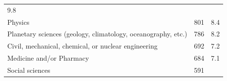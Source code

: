 \documentclass[]{article}
\begin{document}
\begin{longtable}[]{@{}lrr@{}}
\begin{minipage}[t]{0.05\columnwidth}
9.8\strut
\end{minipage}\tabularnewline
\begin{minipage}[t]{0.81\columnwidth}\raggedright\strut
Physics\strut
\end{minipage} & \begin{minipage}[t]{0.05\columnwidth}\raggedleft\strut
801\strut
\end{minipage} & \begin{minipage}[t]{0.05\columnwidth}\raggedleft\strut
8.4\strut
\end{minipage}\tabularnewline
\begin{minipage}[t]{0.81\columnwidth}\raggedright\strut
Planetary sciences (geology, climatology, oceanography, etc.)\strut
\end{minipage} & \begin{minipage}[t]{0.05\columnwidth}\raggedleft\strut
786\strut
\end{minipage} & \begin{minipage}[t]{0.05\columnwidth}\raggedleft\strut
8.2\strut
\end{minipage}\tabularnewline
\begin{minipage}[t]{0.81\columnwidth}\raggedright\strut
Civil, mechanical, chemical, or nuclear engineering\strut
\end{minipage} & \begin{minipage}[t]{0.05\columnwidth}\raggedleft\strut
692\strut
\end{minipage} & \begin{minipage}[t]{0.05\columnwidth}\raggedleft\strut
7.2\strut
\end{minipage}\tabularnewline
\begin{minipage}[t]{0.81\columnwidth}\raggedright\strut
Medicine and/or Pharmacy\strut
\end{minipage} & \begin{minipage}[t]{0.05\columnwidth}\raggedleft\strut
684\strut
\end{minipage} & \begin{minipage}[t]{0.05\columnwidth}\raggedleft\strut
7.1\strut
\end{minipage}\tabularnewline
\begin{minipage}[t]{0.81\columnwidth}\raggedright\strut
Social sciences\strut
\end{minipage} & \begin{minipage}[t]{0.05\columnwidth}\raggedleft\strut
591\strut
\end{minipage} & \begin{minipage}[t]{0.05\columnwidth}\raggedleft\strut

\end{minipage}
\end{longtable}
\end{document}
